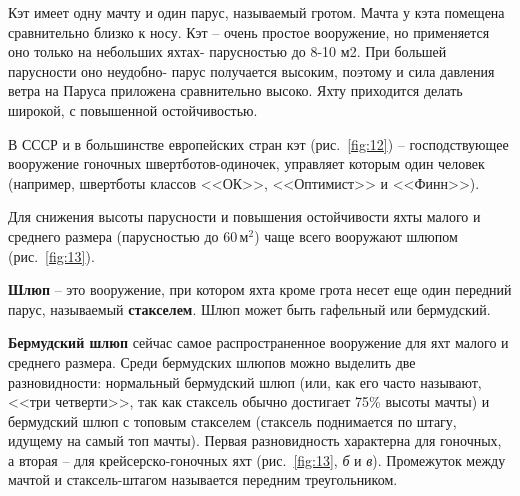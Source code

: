 \documentclass[a4paper, 12pt, twoside, final]{scrbook}
\begin{document}
Кэт имеет одну мачту и один парус, называемый гротом. Мачта у кэта
помещена сравнительно близко к носу. Кэт \--- очень простое вооружение,
но применяется оно только на небольших яхтах- парусностью до 8-10
м2. При большей парусности оно неудобно- парус получается высоким,
поэтому и сила давления ветра на Паруса приложена сравнительно высоко.
Яхту приходится делать широкой, с повышенной остойчивостью.

В СССР и в большинстве европейских стран кэт (рис.~\ref{fig:12}) \--- господствующее вооружение гоночных швертботов-одиночек, управляет
которым один человек (например, швертботы классов <<ОК>>, <<Оптимист>>
и <<Финн>>).

Для снижения высоты парусности и повышения остойчивости яхты малого
и среднего размера (парусностью до 60\,$\mbox{м}^2$) чаще всего вооружают
шлюпом (рис.~\ref{fig:13}).

\textbf{Шлюп} \--- это вооружение, при котором яхта кроме грота несет
еще один передний парус, называемый \textbf{стакселем}. Шлюп может
быть гафельный или бермудский.

\textbf{Бермудский шлюп} сейчас самое распространенное вооружение для яхт малого
и среднего размера. Среди бермудских шлюпов можно выделить две разновидности:
нормальный бермудский шлюп (или, как его часто называют, <<три четверти>>,
так как стаксель обычно достигает 75\% высоты мачты) и бермудский
шлюп с топовым стакселем (стаксель поднимается по штагу, идущему на
самый топ мачты). Первая разновидность характерна для гоночных, а
вторая \--- для крейсерско-гоночных яхт (рис.~\ref{fig:13},
\emph{б} и \emph{в}). Промежуток между мачтой и стаксель-штагом называется
передним треугольником.
\end{document}
